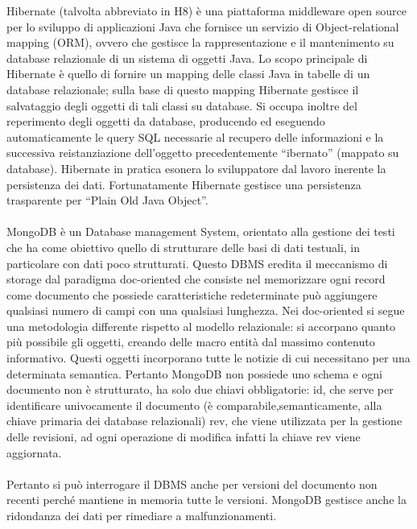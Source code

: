 Hibernate (talvolta abbreviato in H8) è una piattaforma middleware open source per lo sviluppo di applicazioni Java che fornisce un servizio di Object-relational mapping (ORM), ovvero che gestisce la rappresentazione e il mantenimento su database relazionale di un sistema di oggetti Java. Lo scopo principale di Hibernate è quello di fornire un mapping delle
classi Java in tabelle di un database relazionale; sulla base di questo
mapping Hibernate gestisce il salvataggio degli oggetti di tali classi su database. Si occupa inoltre del reperimento degli oggetti da database, producendo ed eseguendo automaticamente le query SQL necessarie al recupero delle informazioni e la successiva reistanziazione dell’oggetto precedentemente “ibernato” (mappato su database).
Hibernate in pratica esonera lo sviluppatore dal lavoro inerente la persistenza dei dati.
Fortunatamente Hibernate gestisce una persistenza trasparente per “Plain Old Java
Object”.
\paragraph{}


MongoDB è un Database management System, orientato alla gestione dei testi che ha come obiettivo quello di strutturare delle basi di dati testuali, in particolare con dati poco strutturati.
Questo DBMS eredita il meccanismo di storage dal paradigma doc-oriented che consiste nel memorizzare ogni record come documento che possiede caratteristiche redeterminate può aggiungere qualsiasi numero di campi con una qualsiasi lunghezza.
Nei doc-oriented si segue una metodologia differente rispetto al modello relazionale: si accorpano quanto più possibile gli oggetti, creando delle macro entità dal massimo contenuto informativo. Questi oggetti incorporano tutte le notizie di cui necessitano per una determinata semantica.
Pertanto MongoDB non possiede uno schema e ogni documento non è strutturato, ha solo due chiavi obbligatorie:
id, che serve per identificare univocamente il documento (è comparabile,semanticamente, alla chiave primaria dei database relazionali)
rev, che viene utilizzata per la gestione delle revisioni, ad ogni operazione di modifica infatti la chiave rev viene aggiornata.
\paragraph{}

Pertanto si può interrogare il DBMS anche per versioni del documento non recenti perché mantiene in memoria tutte le versioni.
MongoDB gestisce anche la ridondanza dei dati per rimediare a malfunzionamenti.
